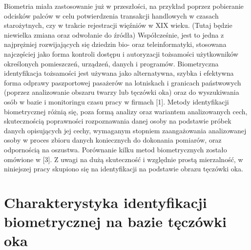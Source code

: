 Biometria miała zastosowanie już w przeszłości, na przykład poprzez pobieranie odcisków palców w celu potwierdzenia transakcji handlowych w czasach starożytnych, czy w trakcie rejestracji więźniów w XIX wieku. (Tutaj będzie niewielka zmiana oraz odwołanie do źródła) Współcześnie, jest to jedna z najprężniej rozwijających się dziedzin bio- oraz teleinformatyki, stosowana najczęściej jako forma kontroli dostępu i autoryzacji tożsamości użytkowników określonych pomieszczeń, urządzeń, danych i programów. Biometryczna identyfikacja tożsamości jest używana jako alternatywna, szybka i efektywna forma odprawy paszportowej pasażerów na lotniskach i granicach państwowych (poprzez analizowanie obszaru twarzy lub tęczówki oka) oraz do wyszukiwania osób w bazie i monitoringu czasu pracy w firmach [1].
	Metody identyfikacji biometrycznej różnią się, poza formą analizy oraz wariantem analizowanych cech, skutecznością poprawności rozpoznawania danej osoby na podstawie próbek danych opisujących jej cechy, wymaganym stopniem zaangażowania analizowanej osoby w proces zbioru danych koniecznych do dokonania pomiarów, oraz odpornością na oszustwa. Porównanie kilku metod biometrycznych zostało omówione w [3]. Z uwagi na dużą skuteczność i względnie prostą mierzalność, w niniejszej pracy skupiono się na identyfikacji na podstawie obrazu tęczówki oka.



\section{Charakterystyka identyfikacji biometrycznej na bazie tęczówki oka}
\label{sec:zawartoscPracy}


